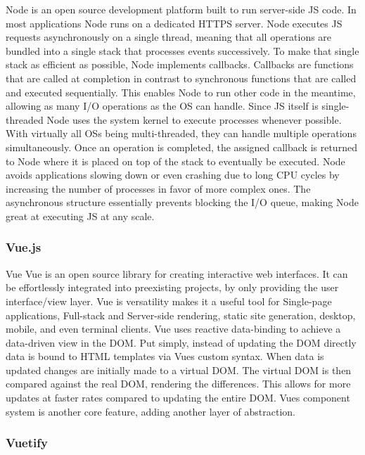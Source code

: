 \documentclass[
a4paper,
11pt
]{article}
\begin{document}
	\ac{Node} is an open source development platform built to run server-side \ac{JS} code. In most applications \ac{Node} runs on a dedicated \ac{HTTPS} server. Node executes \ac{JS} requests asynchronously on a single thread, meaning that all operations are bundled into a single stack that processes events successively. To make that single stack as efficient as possible, \ac{Node} implements callbacks. Callbacks are functions that are called at completion in contrast to synchronous functions that are called and executed sequentially. This enables \ac{Node} to run other code in the meantime, allowing as many \ac{I/O} operations as the \ac{OS} can handle. Since \ac{JS} itself is single-threaded Node uses the system kernel to execute processes whenever possible. With virtually all \acp{OS} being multi-threaded, they can handle multiple operations simultaneously. Once an operation is completed, the assigned callback is returned to \ac{Node} where it is placed on top of the stack to eventually be executed. \ac{Node} avoids applications slowing down or even crashing due to long \ac{CPU} cycles by increasing the number of processes in favor of more complex ones. The asynchronous structure essentially prevents blocking the \ac{I/O} queue, making Node great at executing \ac{JS} at any scale.\cite{nodejs_about_nodate}
	
	\subsubsection{Vue.js}
	\ac{Vue} \ac{Vue} is an open source library for creating interactive web interfaces. It can be effortlessly integrated into preexisting projects, by only providing the user interface/view layer. \ac{Vue} is versatility makes it a useful tool for Single-page applications, Full-stack and Server-side rendering, static site generation, desktop, mobile, and even terminal clients. \ac{Vue} uses reactive data-binding to achieve a data-driven view in the \ac{DOM}. Put simply, instead of updating the \ac{DOM} directly data is bound to \ac{HTML} templates via \acp{Vue} custom syntax. When data is updated changes are initially made to a virtual \ac{DOM}. The virtual \ac{DOM} is then compared against the real \ac{DOM}, rendering the differences. This allows for more updates at faster rates compared to updating the entire \ac{DOM}. \acp{Vue} component system is another core feature, adding another layer of abstraction.\cite{noauthor_introduction_nodate}
	
	\subsubsection{Vuetify}
	
\end{document}
